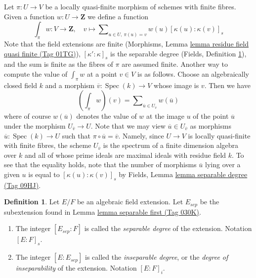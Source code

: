 \documentclass{amsart}
\theoremstyle{plain}
\theoremstyle{definition}
\newtheorem{definition}[subsection]{Definition}
\theoremstyle{remark}
\numberwithin{equation}{subsection}
\def\Spec{\mathop{\mathrm{Spec}}}
\begin{document}
\medskip\noindent
Let $\pi : U \to V$ be a locally quasi-finite morphism of schemes with
finite fibres. Given a function $w : U \to \mathbf{Z}$ we define a function
$$
\textstyle{\int}_\pi w : V \longrightarrow \mathbf{Z},\quad
v \longmapsto
\sum\nolimits_{u \in U,\ \pi(u) = v} w(u) [\kappa(u) : \kappa(v)]_s
$$
Note that the field extensions are finite
(Morphisms, Lemma \href{https://stacks.math.columbia.edu/tag/01TG}{lemma residue field quasi finite (Tag 01TG)}),
$[\kappa' : \kappa]_s$ is the separable degree
(Fields, Definition \ref{fields-definition-insep-degree}),
and the sum is finite as the fibres of $\pi$ are assumed finite.
Another way to compute the value of $\int_\pi w$ at a point $v \in V$
is as follows.
Choose an algebraically closed field $k$ and a morphism
$\overline{v} : \Spec(k) \to V$ whose image is $v$. Then we have
$$
(\textstyle{\int}_\pi w)(v) =
\sum\nolimits_{\overline{u} \in U_{\overline{v}}} w(\overline{u})
$$
where of course $w(\overline{u})$ denotes the value of $w$ at the
image $u$ of the point $\overline{u}$ under the morphism
$U_{\overline{v}} \to U$.
Note that we may view $\overline{u} \in U_{\overline{v}}$ as morphisms
$\overline{u} : \Spec(k) \to U$ such that
$\pi \circ \overline{u} = \overline{v}$. Namely, since
$U \to V$ is locally quasi-finite with finite fibres,
the scheme $U_{\overline{v}}$ is the spectrum
of a finite dimension algebra over $k$ and all of whose prime ideals
are maximal ideals with residue field $k$. To see that the equality
holds, note that the number of morphisms $\overline{u}$ lying over
a given $u$ is equal to $[\kappa(u) : \kappa(v)]_s$ by
Fields, Lemma \href{https://stacks.math.columbia.edu/tag/09HJ}{lemma separable degree (Tag 09HJ)}.



\begin{definition}
\label{fields-definition-insep-degree}
Let $E/F$ be an algebraic field extension. Let $E_{sep}$ be the subextension
found in Lemma \href{https://stacks.math.columbia.edu/tag/030K}{lemma separable first (Tag 030K)}.
\begin{enumerate}
\item The integer $[E_{sep} : F]$ is called the {\it separable
degree} of the extension. Notation $[E : F]_s$.
\item The integer $[E : E_{sep}]$ is called the {\it inseparable
degree}, or the {\it degree of inseparability} of the extension.
Notation $[E : F]_i$.
\end{enumerate}
\end{definition}
\end{document}
